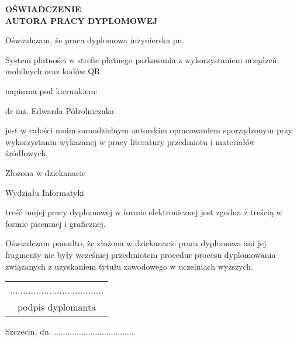 
\vspace*{\fill}

\begin{center}
	{\large \textbf{OŚWIADCZENIE\\AUTORA PRACY DYPLOMOWEJ}}
\end{center}

\vspace{1cm}

Oświadczam, że praca dyplomowa inżynierska pn.

\begin{center}
	System płatności w strefie płatnego parkowania z wykorzystaniem urządzeń mobilnych oraz kodów QR
\end{center}

napisana pod kierunkiem:

\begin{center}
	dr inż. Edwarda Półrolniczaka
\end{center}

jest w całości moim samodzielnym autorskim opracowaniem sporządzonym przy wykorzystaniu wykazanej w pracy literatury przedmiotu i materiałów źródłowych. 

Złożona w dziekanacie

\begin{center}
	Wydziału Informatyki
\end{center}

treść  mojej pracy dyplomowej w formie elektronicznej jest zgodna z treścią w formie pisemnej i graficznej.

Oświadczam ponadto, że złożona w dziekanacie praca dyplomowa ani jej fragmenty nie były wcześniej przedmiotem procedur procesu dyplomowania związanych z uzyskaniem tytułu zawodowego w uczelniach wyższych.

\vspace{2cm}

\begin{flushright}
	\begin{tabular}{ c }
		{\footnotesize ....................................}\\[-.8em]
		{\footnotesize podpis dyplomanta}
	\end{tabular}
\end{flushright}

{\footnotesize Szczecin, dn. ....................................}

\vspace*{\fill}